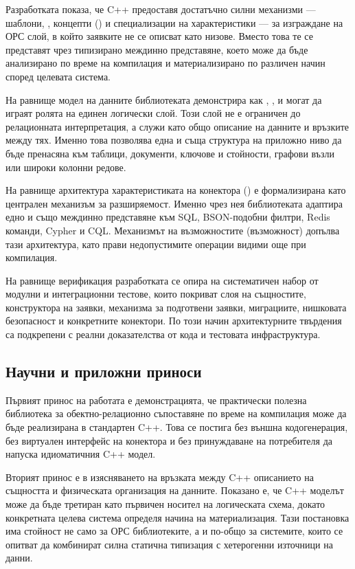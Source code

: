 Разработката показа, че C++ предоставя достатъчно силни механизми --- шаблони, , концепти () и специализации на характеристики --- за изграждане на ОРС слой, в който заявките не се описват като низове. Вместо това те се представят чрез типизирано междинно представяне, което може да бъде анализирано по време на компилация и материализирано по различен начин според целевата система.

На равнище модел на данните библиотеката демонстрира как , ,  и  могат да играят ролята на единен логически слой. Този слой не е ограничен до релационната интерпретация, а служи като общо описание на данните и връзките между тях. Именно това позволява една и съща структура на приложно ниво да бъде пренасяна към таблици, документи, ключове и стойности, графови възли или широки колонни редове.

На равнище архитектура характеристиката на конектора () е формализирана като централен механизъм за разширяемост. Именно чрез нея библиотеката адаптира едно и също междинно представяне към SQL, BSON-подобни филтри, Redis команди, Cypher и CQL. Механизмът на възможностите (възможност) допълва тази архитектура, като прави недопустимите операции видими още при компилация.

На равнище верификация разработката се опира на систематичен набор от модулни и интеграционни тестове, които покриват слоя на същностите, конструктора на заявки, механизма за подготвени заявки, миграциите, нишковата безопасност и конкретните конектори. По този начин архитектурните твърдения са подкрепени с реални доказателства от кода и тестовата инфраструктура.

\subsection{Научни и приложни приноси}

Първият принос на работата е демонстрацията, че практически полезна библиотека за обектно-релационно съпоставяне по време на компилация може да бъде реализирана в стандартен C++. Това се постига без външна кодогенерация, без виртуален интерфейс на конектора и без принуждаване на потребителя да напуска идиоматичния C++ модел.

Вторият принос е в изясняването на връзката между C++ описанието на същността и физическата организация на данните. Показано е, че C++ моделът може да бъде третиран като първичен носител на логическата схема, докато конкретната целева система определя начина на материализация. Тази постановка има стойност не само за ОРС библиотеките, а и по-общо за системите, които се опитват да комбинират силна статична типизация с хетерогенни източници на данни.


